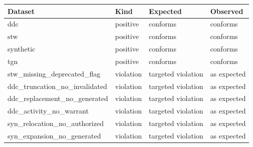 \begin{tabular}{llll}
\toprule
Dataset & Kind & Expected & Observed \\
\midrule
ddc & positive & conforms & conforms \\
stw & positive & conforms & conforms \\
synthetic & positive & conforms & conforms \\
tgn & positive & conforms & conforms \\
stw\_missing\_deprecated\_flag & violation & targeted violation & as expected \\
ddc\_truncation\_no\_invalidated & violation & targeted violation & as expected \\
ddc\_replacement\_no\_generated & violation & targeted violation & as expected \\
ddc\_activity\_no\_warrant & violation & targeted violation & as expected \\
syn\_relocation\_no\_authorized & violation & targeted violation & as expected \\
syn\_expansion\_no\_generated & violation & targeted violation & as expected \\
\bottomrule
\end{tabular}